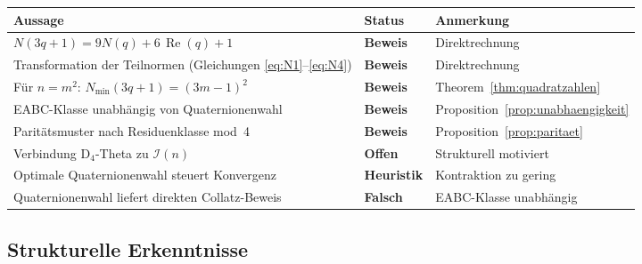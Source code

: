 \documentclass[12pt,a4paper]{article}
\newcommand{\In}{\mathcal{I}}
\newcommand{\Re}{\operatorname{Re}}
\begin{document}
\begin{center}
\renewcommand{\arraystretch}{1.5}
\begin{tabular}{p{7cm} p{2.8cm} p{3.5cm}}
\toprule
\textbf{Aussage} & \textbf{Status} & \textbf{Anmerkung} \\
\midrule
$N(3q+1) = 9N(q) + 6\,\Re(q) + 1$
  & \textcolor{bewiesengrün}{\bfseries Beweis}
  & Direktrechnung \\
Transformation der Teilnormen (Gleichungen \ref{eq:N1}--\ref{eq:N4})
  & \textcolor{bewiesengrün}{\bfseries Beweis}
  & Direktrechnung \\
Für $n = m^2$: $N_{\min}(3q+1) = (3m-1)^2$
  & \textcolor{bewiesengrün}{\bfseries Beweis}
  & Theorem~\ref{thm:quadratzahlen} \\
EABC-Klasse unabhängig von Quaternionenwahl
  & \textcolor{bewiesengrün}{\bfseries Beweis}
  & Proposition~\ref{prop:unabhaengigkeit} \\
Paritätsmuster nach Residuenklasse mod~4
  & \textcolor{bewiesengrün}{\bfseries Beweis}
  & Proposition~\ref{prop:paritaet} \\
\midrule
Verbindung D${}_4$-Theta zu $\In(n)$
  & \textcolor{warnorange}{\bfseries Offen}
  & Strukturell motiviert \\
Optimale Quaternionenwahl steuert Konvergenz
  & \textcolor{warnorange}{\bfseries Heuristik}
  & Kontraktion zu gering \\
\midrule
Quaternionenwahl liefert direkten Collatz-Beweis
  & \textcolor{lückenrot}{\bfseries Falsch}
  & EABC-Klasse unabhängig \\
\bottomrule
\end{tabular}
\end{center}

\subsection{Strukturelle Erkenntnisse}
\end{document}
